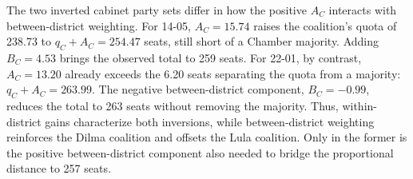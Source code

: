 \documentclass[11pt]{article}
\begin{document}
The two inverted cabinet party sets differ in how the positive \(A_C\)
interacts with between-district weighting. For 14-05, \(A_C=15.74\)
raises the coalition's quota of 238.73 to \(q_C+A_C=254.47\) seats,
still short of a Chamber majority. Adding \(B_C=4.53\) brings the
observed total to 259 seats. For 22-01, by contrast, \(A_C=13.20\)
already exceeds the 6.20 seats separating the quota from a majority:
\(q_C+A_C=263.99\). The negative between-district component,
\(B_C=-0.99\), reduces the total to 263 seats without removing the
majority. Thus, within-district gains characterize both inversions, while
between-district weighting reinforces the Dilma coalition and offsets the
Lula coalition. Only in the former is the positive between-district
component also needed to bridge the proportional distance to 257 seats.


\end{document}
